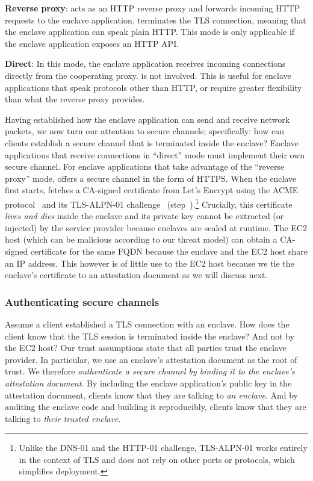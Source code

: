 {\bf Reverse proxy}: \Tool{} acts as an HTTP reverse proxy and forwards incoming
HTTP requests to the enclave application.  \Tool{} terminates the TLS
connection, meaning that the enclave application can speak plain HTTP.  This
mode is only applicable if the enclave application exposes an HTTP API.

{\bf Direct}: In this mode, the enclave application receives incoming
connections directly from the cooperating proxy.  \Tool{} is not involved.  This
is useful for enclave applications that speak protocols other than HTTP, or
require greater flexibility than what the reverse proxy provides.

Having established how the enclave application can send and receive network
packets, we now turn our attention to secure channels; specifically: how can
clients establish a secure channel that is terminated inside the enclave?
Enclave applications that receive connections in ``direct'' mode must implement
their own secure channel.   For enclave applications that take advantage of the
``reverse proxy'' mode, \tool{} offers a secure channel in the form of HTTPS.
When the enclave first starts, \tool{} fetches a CA-signed certificate from
Let's Encrypt using the ACME protocol~\cite{acme-protocol} and its TLS-ALPN-01
challenge~\cite{tls-alpn} (step~).\footnote{Unlike the DNS-01 and the
HTTP-01 challenge, TLS-ALPN-01 works entirely in the context of TLS and does not
rely on other ports or protocols, which simplifies deployment.}  Crucially, this
certificate \emph{lives and dies} inside the enclave and its private key cannot
be extracted (or injected) by the service provider because enclaves are sealed
at runtime.
%
The EC2 host (which can be malicious according to our threat model) can obtain a
CA-signed certificate for the same FQDN because the enclave and the EC2 host
share an IP address.  This however is of little use to the EC2 host because we
tie the enclave's certificate to an attestation document as we will discuss
next.

\subsubsection{Authenticating secure channels}%
\label{sec:attestation}

Assume a client established a TLS connection with an enclave.  How does the
client know that the TLS session is terminated inside the enclave?  And not by
the EC2 host?  Our trust assumptions state that all parties trust the enclave
provider.  In particular, we use an enclave's attestation document as the root
of trust.  We therefore \emph{authenticate a secure channel by binding it to the
enclave's attestation document}.  By including the enclave application's public
key in the attestation document, clients know that they are talking to \emph{an
enclave}.  And by auditing the enclave code and building it reproducibly,
clients know that they are talking to \emph{their trusted enclave}.

